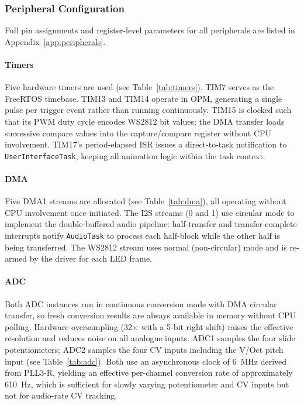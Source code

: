 
\subsubsection{Peripheral Configuration}
\label{sec:peripheral-tables}

Full pin assignments and register-level parameters for all peripherals are listed in Appendix~\ref{app:peripherals}.

\paragraph{Timers}
Five hardware timers are used (see Table~\ref{tab:timers}).
TIM7 serves as the FreeRTOS timebase.
TIM13 and TIM14 operate in \ac{OPM}, generating a single pulse per trigger event rather than running continuously.
TIM15 is clocked such that its PWM duty cycle encodes WS2812 bit values; the DMA transfer loads successive compare values into the capture/compare register without CPU involvement.
TIM17's period-elapsed \ac{ISR} issues a direct-to-task notification to \texttt{UserInterfaceTask}, keeping all animation logic within the task context.

\paragraph{DMA}
Five DMA1 streams are allocated (see Table~\ref{tab:dma}), all operating without CPU involvement once initiated.
The I2S streams (0 and 1) use circular mode to implement the double-buffered audio pipeline: half-transfer and transfer-complete interrupts notify \texttt{AudioTask} to process each half-block while the other half is being transferred.
The WS2812 stream uses normal (non-circular) mode and is re-armed by the driver for each LED frame.

\paragraph{ADC}
Both ADC instances run in continuous conversion mode with DMA circular transfer, so fresh conversion results are always available in memory without CPU polling.
Hardware oversampling (32$\times$ with a 5-bit right shift) raises the effective resolution and reduces noise on all analogue inputs.
ADC1 samples the four slide potentiometers; ADC2 samples the four CV inputs including the V/Oct pitch input (see Table~\ref{tab:adc}).
Both use an asynchronous clock of \SI{6}{\mega\hertz} derived from PLL3-R, yielding an effective per-channel conversion rate of approximately \SI{610}{\hertz}, which is sufficient for slowly varying potentiometer and CV inputs but not for audio-rate CV tracking.

